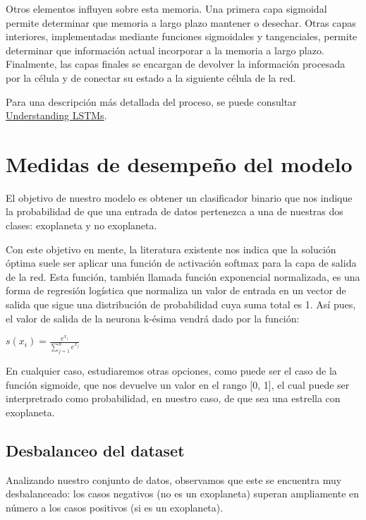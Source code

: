 Otros elementos influyen sobre esta memoria. Una primera capa sigmoidal permite determinar que memoria a largo plazo mantener o desechar. Otras capas interiores, implementadas mediante funciones sigmoidales y tangenciales, permite determinar que información actual incorporar a la memoria a largo plazo. Finalmente, las capas finales se encargan de devolver la información procesada por la célula y de conectar su estado a la siguiente célula de la red.

Para una descripción más detallada del proceso, se puede consultar \href{https://colah.github.io/posts/2015-08-Understanding-LSTMs/}{Understanding LSTMs}.


\section{Medidas de desempeño del modelo}\label{sec:metricas}

El objetivo de nuestro modelo es obtener un clasificador binario que nos
indique la probabilidad de que una entrada de datos pertenezca a una de
nuestras dos clases: exoplaneta y no exoplaneta.

Con este objetivo en mente, la literatura existente nos indica que la
solución óptima suele ser aplicar una función de activación softmax para
la capa de salida de la red. Esta función, también llamada función
exponencial normalizada, es una forma de regresión logística que
normaliza un valor de entrada en un vector de salida que sigue una
distribución de probabilidad cuya suma total es 1. Así pues, el valor de
salida de la neurona k-ésima vendrá dado por la función:

\begin{math}
s(x_{i})=\frac{e^{x_{i}}}{\sum_{j=1}^{n}e^{x_j}}
\end{math}

En cualquier caso, estudiaremos otras opciones, como puede ser el caso
de la función sigmoide, que nos devuelve un valor en el rango {[}0,
1{]}, el cual puede ser interpretrado como probabilidad, en nuestro
caso, de que sea una estrella con exoplaneta.

\subsection{Desbalanceo del dataset}\label{desbalanceo-del-dataset}

Analizando nuestro conjunto de datos, observamos que este se encuentra
muy desbalanceado: los casos negativos (no es un exoplaneta) superan
ampliamente en número a los casos positivos (si es un exoplaneta).

